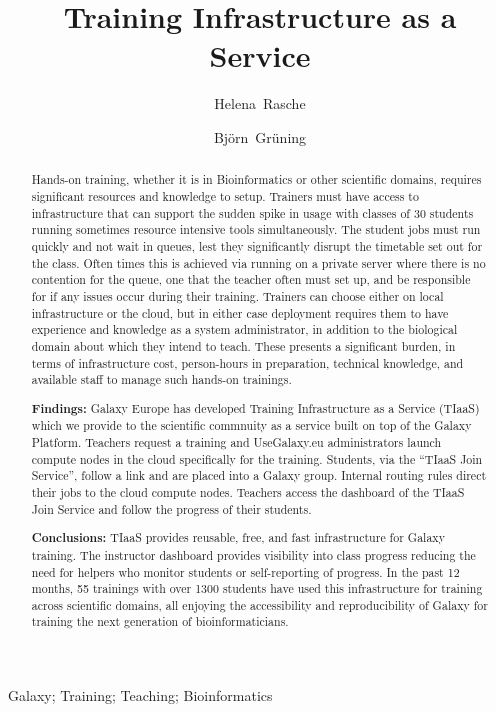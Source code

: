 \documentclass[a4paper,num-refs]{oup-contemporary}
\title{Training Infrastructure as a Service}
\author[1,\authfn{1},\authfn{2}]{Helena~Rasche}
\author[2,\authfn{2}]{Bj\"orn~Gr\"uning}
\affil[1]{Bioinformatics Group, Department of Computer Science, University of Freiburg, 79110 Freiburg im Breisgau, Germany}
\begin{document}
\begin{frontmatter}
\maketitle
\begin{abstract}
Hands-on training, whether it is in Bioinformatics or other scientific domains, requires significant resources and knowledge to setup.
Trainers must have access to infrastructure that can support the sudden spike in usage with classes of 30 students running sometimes resource intensive tools simultaneously.
The student jobs must run quickly and not wait in queues, lest they significantly disrupt the timetable set out for the class.
Often times this is achieved via running on a private server where there is no contention for the queue, one that the teacher often must set up, and be responsible for if any issues occur during their training.
Trainers can choose either on local infrastructure or the cloud, but in either case deployment requires them to have experience and knowledge as a system administrator, in addition to the biological domain about which they intend to teach.
These presents a significant burden, in terms of infrastructure cost, person-hours in preparation, technical knowledge, and available staff to manage such hands-on trainings.

\textbf{Findings:} Galaxy Europe has developed Training Infrastructure as a Service (TIaaS) which we provide to the scientific commnuity as a service built on top of the Galaxy Platform. Teachers request a training and UseGalaxy.eu administrators launch compute nodes in the cloud specifically for the training. Students, via the ``TIaaS Join Service'', follow a link and are placed into a Galaxy group. Internal routing rules direct their jobs to the cloud compute nodes. Teachers access the dashboard of the TIaaS Join Service and follow the progress of their students.

\textbf{Conclusions:} TIaaS provides reusable, free, and fast infrastructure for Galaxy training. The instructor dashboard provides visibility into class progress reducing the need for helpers who monitor students or self-reporting of progress. In the past 12 months, 55 trainings with over 1300 students have used this infrastructure for training across scientific domains, all enjoying the accessibility and reproducibility of Galaxy for training the next generation of bioinformaticians.
\end{abstract}

\begin{keywords}
Galaxy; Training; Teaching; Bioinformatics
\end{keywords}
\end{frontmatter}
\end{document}
